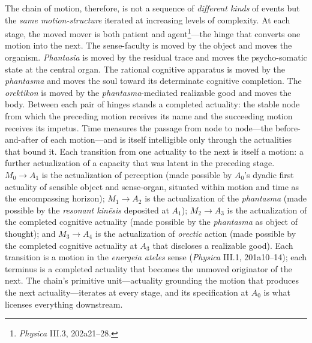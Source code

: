 The chain of motion, therefore, is not a sequence of \textit{different kinds} of events but the \textit{same motion-structure} iterated at increasing levels of complexity. At each stage, the moved mover is both patient and agent\footnote{\textit{Physica} III.3, 202a21--28.}---the hinge that converts one motion into the next. The sense-faculty is moved by the object and moves the organism. \textit{Phantasia} is moved by the residual trace and moves the psycho-somatic state at the central organ. The rational cognitive apparatus is moved by the \textit{phantasma} and moves the soul toward its determinate cognitive completion. The \textit{orektikon} is moved by the \textit{phantasma}-mediated realizable good and moves the body. Between each pair of hinges stands a completed actuality: the stable node from which the preceding motion receives its name and the succeeding motion receives its impetus. Time measures the passage from node to node---the before-and-after of each motion---and is itself intelligible only through the actualities that bound it. Each transition from one actuality to the next is itself a motion: a further actualization of a capacity that was latent in the preceding stage. $M_0 \rightarrow A_1$ is the actualization of perception (made possible by $A_0$'s dyadic first actuality of sensible object and sense-organ, situated within motion and time as the encompassing horizon); $M_1 \rightarrow A_2$ is the actualization of the \textit{phantasma} (made possible by the \textit{resonant kinēsis} deposited at $A_1$); $M_2 \rightarrow A_3$ is the actualization of the completed cognitive actuality (made possible by the \textit{phantasma} as object of thought); and $M_3 \rightarrow A_4$ is the actualization of \textit{orectic} action (made possible by the completed cognitive actuality at $A_3$ that discloses a realizable good). Each transition is a motion in the \textit{energeia ateles} sense (\textit{Physica} III.1, 201a10--14); each terminus is a completed actuality that becomes the unmoved originator of the next. The chain's primitive unit---actuality grounding the motion that produces the next actuality---iterates at every stage, and its specification at $A_0$ is what licenses everything downstream. 

